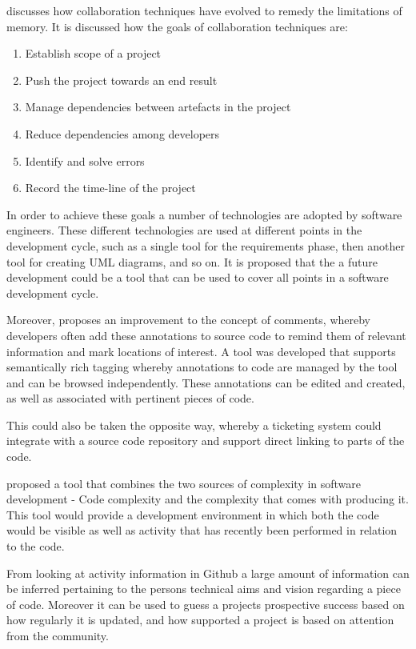 \documentclass{l4proj}
\begin{document}
\citet{whitehead07collaboration} discusses how collaboration techniques have evolved to remedy the limitations of memory. It is discussed how the goals of collaboration techniques are:

\begin {enumerate}
\item Establish scope of a project
\item Push the project towards an end result
\item Manage dependencies between artefacts in the project
\item Reduce dependencies among developers
\item Identify and solve errors
\item Record the time-line of the project
\end {enumerate}

In order to achieve these goals a number of technologies are adopted by software engineers.  These different technologies are used at different points in the development cycle, such as a single tool for the requirements phase, then another tool for creating UML diagrams, and so on.  It is proposed that the a future development could be a tool that can be used to cover all points in a software development cycle.

Moreover, \citet{storey09software} proposes an improvement to the concept of comments, whereby developers often add these annotations to source code to remind them of relevant information and mark locations of interest.  A tool was developed that supports semantically rich tagging whereby annotations to code are managed by the tool and can be browsed independently.  These annotations can be edited and created, as well as associated with pertinent pieces of code.  

This could also be taken the opposite way, whereby a ticketing system could integrate with a source code repository and support direct linking to parts of the code.


\citet{froehlich04unifying} proposed a tool that combines the two sources of complexity in software development - Code complexity and the complexity that comes with producing it.  This tool would provide a development environment in which both the code would be visible as well as activity that has recently been performed in relation to the code.

From looking at activity information in Github a large amount of information can be inferred pertaining to the persons technical aims and vision regarding a piece of code.  Moreover it can be used to guess a projects prospective success based on how regularly it is updated, and how supported a project is based on attention from the community.
\end{document}
